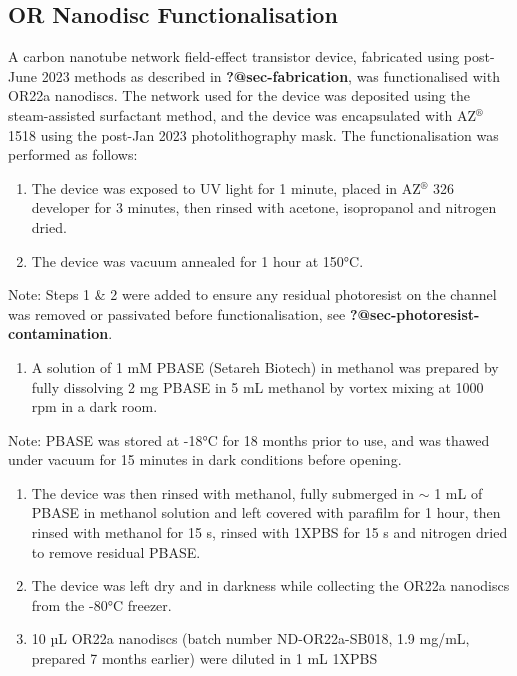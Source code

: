 \documentclass[
  a4paper,
]{scrbook}
\providecommand{\tightlist}{%
  \setlength{\itemsep}{0pt}\setlength{\parskip}{0pt}}\usepackage{longtable,booktabs,array}
\begin{document}
\hypertarget{sec-working-PBASE-functionalisation}{%
\subsection{OR Nanodisc
Functionalisation}\label{sec-working-PBASE-functionalisation}}

A carbon nanotube network field-effect transistor device, fabricated
using post-June 2023 methods as described in \textbf{?@sec-fabrication},
was functionalised with OR22a nanodiscs. The network used for the device
was deposited using the steam-assisted surfactant method, and the device
was encapsulated with AZ\(^\circledR\) 1518 using the post-Jan 2023
photolithography mask. The functionalisation was performed as follows:

\begin{enumerate}
\def\labelenumi{\arabic{enumi}.}
\item
  The device was exposed to UV light for 1 minute, placed in
  AZ\(^\circledR\) 326 developer for 3 minutes, then rinsed with
  acetone, isopropanol and nitrogen dried.
\item
  The device was vacuum annealed for 1 hour at 150°C.
\end{enumerate}

Note: Steps 1 \& 2 were added to ensure any residual photoresist on the
channel was removed or passivated before functionalisation, see
\textbf{?@sec-photoresist-contamination}.

\begin{enumerate}
\def\labelenumi{\arabic{enumi}.}
\setcounter{enumi}{2}
\tightlist
\item
  A solution of 1 mM PBASE (Setareh Biotech) in methanol was prepared by
  fully dissolving 2 mg PBASE in 5 mL methanol by vortex mixing at 1000
  rpm in a dark room.
\end{enumerate}

Note: PBASE was stored at -18°C for 18 months prior to use, and was
thawed under vacuum for 15 minutes in dark conditions before opening.

\begin{enumerate}
\def\labelenumi{\arabic{enumi}.}
\setcounter{enumi}{3}
\item
  The device was then rinsed with methanol, fully submerged in \(\sim\)
  1 mL of PBASE in methanol solution and left covered with parafilm for
  1 hour, then rinsed with methanol for 15 s, rinsed with 1XPBS for 15 s
  and nitrogen dried to remove residual PBASE.
\item
  The device was left dry and in darkness while collecting the OR22a
  nanodiscs from the -80°C freezer.
\item
  10 µL OR22a nanodiscs (batch number ND-OR22a-SB018, 1.9 mg/mL,
  prepared 7 months earlier) were diluted in 1 mL 1XPBS
\end{enumerate}
\end{document}
